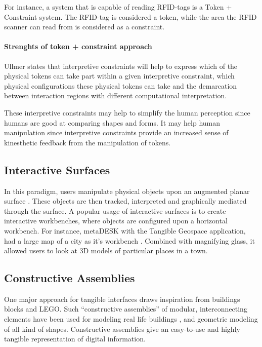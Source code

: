 For instance, a system that is capable of reading RFID-tags is a Token + Constraint system. The RFID-tag is considered a token, while the area the RFID scanner can read from is considered as a constraint.  

\paragraph{Strenghts of token + constraint approach}

Ullmer states that interpretive constraints will help to express which of the physical tokens can take part within a given interpretive constraint, which physical configurations these physical tokens can take and the demarcation between interaction regions with different computational interpretation.

These interpretive constraints may help to simplify the human perception since humans are good at comparing shapes and forms. 
It may help human manipulation since interpretive constraints provide an increased sense of kinesthetic feedback from the manipulation of tokens. 

\subsection{Interactive Surfaces}
In this paradigm, users manipulate physical objects upon an augmented planar surface \cite{ullmer2002tangible}. These objects are then tracked, interpreted and graphically mediated through the surface. A popular usage of interactive surfaces is to create interactive workbenches, where objects are configured upon a horizontal workbench. For instance, metaDESK with the Tangible Geospace application, had a large map of a city as it's workbench \cite{ullmer1997metadesk}. Combined with magnifying glass, it allowed users to look at 3D models of particular places in a town. 



\subsection{Constructive Assemblies}
One major approach for tangible interfaces draws inspiration from buildings blocks and LEGO\texttrademark. Such ``constructive assemblies'' of modular, interconnecting elements have been used for modeling real life buildings \cite{aish1984architecture}, and geometric modeling of all kind of shapes\cite{anderson2000tangible}. Constructive assemblies give an easy-to-use and highly tangible representation of digital information. 

